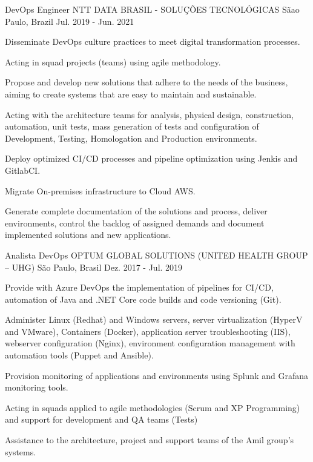 \begin{cventries}
  \cventry
    {DevOps Engineer} %
    {NTT DATA BRASIL - SOLUÇÕES TECNOLÓGICAS} %
    {Sãao Paulo, Brazil} %
    {Jul. 2019 - Jun. 2021} %
    {
      \begin{cvitems} %
        \item {Disseminate DevOps culture practices to meet digital transformation processes.}
        \item {Acting in squad projects (teams) using agile methodology.}
        \item {Propose and develop new solutions that adhere to the needs of the business, aiming to create systems that are easy to maintain and sustainable.}
        \item {Acting with the architecture teams for analysis, physical design, construction, automation, unit tests, mass generation of tests and configuration of Development, Testing, Homologation and Production environments.}
        \item {Deploy optimized CI/CD processes and pipeline optimization using Jenkis and GitlabCI.}
        \item {Migrate On-premises infrastructure to Cloud AWS.}
        \item {Generate complete documentation of the solutions and process, deliver environments, control the backlog of assigned demands and document implemented solutions and new applications.}
      \end{cvitems}
    }
\break

  \cventry
    {Analista DevOps} %
    {OPTUM GLOBAL SOLUTIONS (UNITED HEALTH GROUP – UHG)} %
    {São Paulo, Brasil} %
    {Dez. 2017 - Jul. 2019} %
    {
      \begin{cvitems} %
        \item {Provide with Azure DevOps the implementation of pipelines for CI/CD, automation of Java and .NET Core code builds and code versioning (Git).}
        \item {Administer Linux (Redhat) and Windows servers, server virtualization (HyperV and VMware), Containers (Docker), application server troubleshooting (IIS), webserver configuration (Nginx), environment configuration management with automation tools (Puppet and Ansible).}
        \item {Provision monitoring of applications and environments using Splunk and Grafana monitoring tools.}
        \item {Acting in squads applied to agile methodologies (Scrum and XP Programming) and support for development and QA teams (Tests)}
        \item {Assistance to the architecture, project and support teams of the Amil group's systems.}
      \end{cvitems}
    }


\end{cventries}